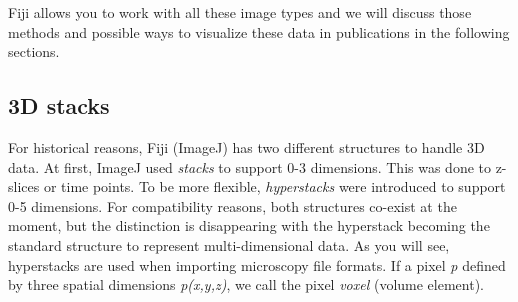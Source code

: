 Fiji allows you to work with all these image types and we will discuss those methods and possible ways to visualize these data in publications in the following sections.

\subsection{3D stacks}

For historical reasons, Fiji (ImageJ) has two different structures to handle 3D data. At first, ImageJ used \emph{stacks} to support 0-3 dimensions. This was done to z-slices or time points. To be more flexible, \emph{hyperstacks} were introduced to support 0-5 dimensions. For compatibility reasons, both structures co-exist at the moment, but the distinction is disappearing with the hyperstack becoming the standard structure to represent multi-dimensional data. As you will see, hyperstacks are used when importing microscopy file formats. If a pixel \emph{p} defined by three spatial dimensions \emph{p(x,y,z)}, we call the pixel \emph{voxel} (volume element).


